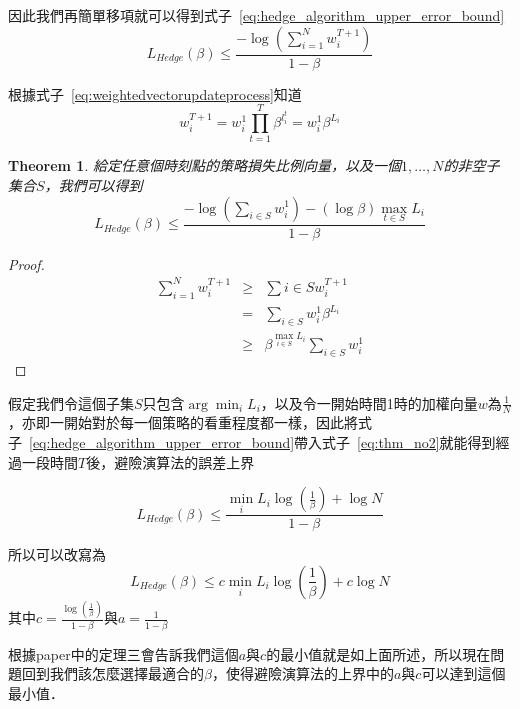 \documentclass[12pt]{report}
\newtheorem{theorem}{Theorem}
\numberwithin{equation}{section}
\begin{document}
\begin{CJK}{UTF8}{bsmi}
因此我們再簡單移項就可以得到式子~\ref{eq:hedge_algorithm_upper_error_bound}
\begin{equation}
 L_{Hedge}(\beta) \leq \frac{-\log (\sum_{i=1}^N w^{T+1}_i)}{1-\beta} 
 \label{eq:hedge_algorithm_upper_error_bound}
\end{equation}



根據式子~\ref{eq:weightedvectorupdateprocess}知道
\begin{equation}
 w^{T+1}_i = w_i^1 \prod_{t=1}^T \beta^{l^t_i} = w^1_i \beta^{L_i}
\end{equation}


\begin{theorem}
\label{thm:no2}
給定任意個時刻點的策略損失比例向量，以及一個${1,…,N}$的\textit{非空子集合}$S$，我們可以得到
\begin{equation}
L_{Hedge}(\beta) \leq \frac{-\log(\sum_{i \in S}w_i^1) - (\log \beta)\max_{t\in S}L_i}{1-\beta}
\label{eq:thm_no2}
\end{equation}
\end{theorem}



\begin{proof}
\begin{eqnarray*}
\sum_{i=1}^N w^{T+1}_i & \geq & \sum{i \in S} w_i^{T+1} \\
						& = & \sum_{i \in S} w_i^1 \beta^{L_i} \\
						& \geq & \beta^{\max_{i \in S}L_i}\sum_{i\in S} w_i^1
\end{eqnarray*}
\end{proof}


假定我們令這個子集$S$只包含$ \arg\min_i L_i$，以及令一開始時間1時的加權向量$w$為$\frac{1}{N}$，亦即一開始對於每一個策略的看重程度都一樣，因此將式子~\ref{eq:hedge_algorithm_upper_error_bound}帶入式子~\ref{eq:thm_no2}就能得到經過一段時間$T$後，避險演算法的誤差上界

\begin{equation}
L_{Hedge}(\beta) \leq \frac{\min_i L_i \log(\frac{1}{\beta})+\log N}{1-\beta}
\label{eq:weightedvectorupdateprocess_clear}
\end{equation}

所以可以改寫為
\[ L_{Hedge}(\beta) \leq c \min_i L_i \log(\frac{1}{\beta})+ c \log N\]
其中$ c = \frac{\log(\frac{1}{\beta})}{1-\beta}$與$ a = \frac{1}{1-\beta}$

根據paper中的定理三會告訴我們這個$a$與$c$的最小值就是如上面所述，所以現在問題回到我們該怎麼選擇最適合的$\beta$，使得避險演算法的上界中的$a$與$c$可以達到這個最小值．


\end{CJK}
\end{document}
